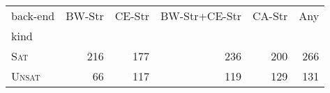 \begin{tabular}{l@{\quad\quad}r@{\quad\quad}r@{\quad\quad}r@{\quad\quad}r@{\quad\quad}r}
\toprule
\Ostrich{} back-end & BW-Str & CE-Str & BW-Str+CE-Str & CA-Str & Any \\
kind &  &  &  \\
\midrule
\textsc{Sat} & 216 & 177 & 236 & 200 & 266 \\
\textsc{Unsat} & 66 & 117 & 119 & 129 & 131 \\
\bottomrule
\end{tabular}
